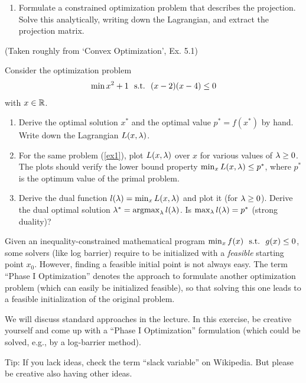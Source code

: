 \begin{enumerate}
	\item Formulate a constrained optimization problem
	that describes the projection.  Solve this analytically, writing down
	the Lagrangian, and extract the projection matrix.
\end{enumerate}







(Taken roughly from `Convex Optimization', Ex. 5.1)

Consider the optimization problem
\begin{align}\label{ex1}
\min x^2 + 1 ~~\text{s.t.}~~ (x-2)(x-4) \le 0
\end{align}
with $x \in {\mathbb{R}}$.

\begin{enumerate}
\item Derive the optimal solution $x^*$ and the optimal value
$p^*=f(x^*)$ by hand. Write down the Lagrangian $L(x,\lambda)$.

\item For the same problem (\ref{ex1}), plot $L(x,\lambda)$ over $x$ for various values of $\lambda\ge 0$.
The plots should verify the lower bound property $\min_x L(x,\lambda) \le
p^*$, where $p^*$ is the optimum value of the primal problem.

\item Derive the dual function $l(\lambda) = \min_x L(x,\lambda)$ and plot it (for $\lambda\ge
0$). Derive the dual optimal solution $\lambda^* = \operatorname*{argmax}_\lambda l(\lambda)$. Is
$\max_\lambda l(\lambda) = p^*$ (strong duality)?
\end{enumerate}




Given an inequality-constrained mathematical program $\min_x f(x) ~~\text{s.t.}~~ g(x)\le0$, some solvers (like log barrier) require to be initialized with a \emph{feasible} starting point $x_0$. However, finding a feasible initial point is not always easy. The term ``Phase I Optimization'' denotes the approach to formulate another optimization problem (which can easily be initialized feasible), so that solving this one leads to a feasible initialization of the original problem.

We will discuss standard approaches in the lecture. In this exercise, be creative yourself and come up with a ``Phase I Optimization'' formulation (which could be solved, e.g., by a log-barrier method).

Tip: If you lack ideas, check the term ``slack variable'' on Wikipedia. But please be creative also having other ideas.


\exerfoot
